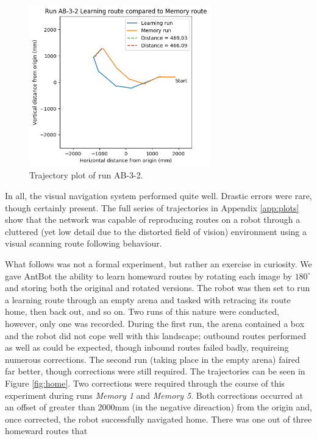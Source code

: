 \documentclass[a4paper,11pt,twoside,openright]{article}
\begin{document}
\begin{figure}
 \centering
  \includegraphics[width=0.7\textwidth]{AB-3-2}
  \caption{
    \label{fig:ab-3-2-inside} Trajectory plot of run AB-3-2.
  }
\end{figure}

In all, the visual navigation system performed quite well. Drastic errors were rare, though certainly present. The full series
of trajectories in Appendix \ref{app:plots} show that the network was capable of reproducing routes on a robot through a
cluttered (yet low detail due to the distorted field of vision) environment using a visual scanning route following behaviour.
\newline

What follows was not a formal experiment, but rather an exercise in curiosity. We gave AntBot the ability to learn homeward
routes by rotating each image by $180^{\circ}$ and storing both the original and rotated versions. The robot was then set
to run a learning route through an empty arena and tasked with retracing its route home, then back out, and so on. Two runs
of this nature were conducted, however, only one was recorded. During the first run, the arena contained a box and the
robot did not cope well with this landscape; outbound routes performed as well as could be expected, though inbound routes
failed badly, requireing numerous corrections. The second run (taking place in the empty arena) faired far better, though
corrections were still required. The trajectories can be seen in Figure \ref{fig:home}. Two corrections were required
through the course of this experiment during runs \textit{Memory 1} and \textit{Memory 5}. Both corrections occurred
at an offset of greater than 2000mm (in the negative direaction) from the origin and, once corrected, the robot successfully
navigated home. There was one out of three homeward routes that  
\end{document}
